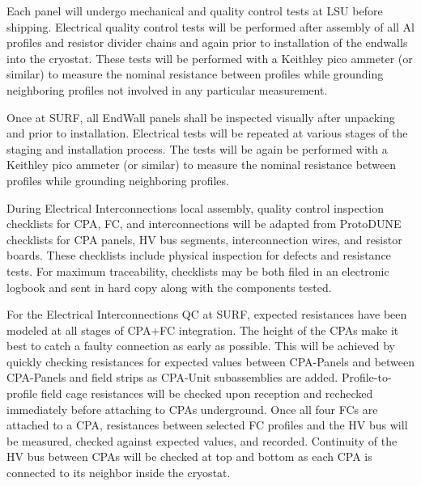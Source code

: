Each panel will undergo mechanical and quality control tests at LSU before shipping. Electrical quality control tests will be performed after assembly of all Al profiles and resistor divider chains and again prior to installation of the endwalls into the cryostat. These tests will be performed with a Keithley pico ammeter (or similar) to measure the nominal resistance between profiles while grounding neighboring profiles not involved in any particular measurement.





Once at SURF, all EndWall panels shall be inspected visually after unpacking and prior to installation. Electrical tests will be repeated at various stages of the staging and installation process.
The tests will be again be performed with a Keithley pico ammeter (or similar) to measure the nominal resistance between profiles while grounding neighboring profiles.

During Electrical Interconnections local assembly, quality control inspection checklists for CPA, FC, and
interconnections will be adapted from ProtoDUNE checklists for CPA
panels, HV bus segments, interconnection wires, and resistor boards.
These checklists include physical inspection for defects and
resistance tests.  For maximum traceability, checklists may be both
filed in an electronic logbook and sent in hard copy along with the
components tested.

For the Electrical Interconnections QC at SURF, expected resistances have been modeled at all stages of
CPA+FC integration.  The height of the CPAs make it best to catch a
faulty connection as early as possible.  This will be achieved by
quickly checking resistances for expected values between CPA-Panels and between CPA-Panels and field strips as CPA-Unit subassemblies are added.  Profile-to-profile field cage resistances
will be checked upon reception and rechecked immediately before
attaching to CPAs underground.  Once all four FCs are attached to a
CPA, resistances between selected FC profiles and the HV bus will be
measured, checked against expected values, and recorded. Continuity of
the HV bus between CPAs will be checked at top and bottom as each CPA
is connected to its neighbor inside the cryostat.



